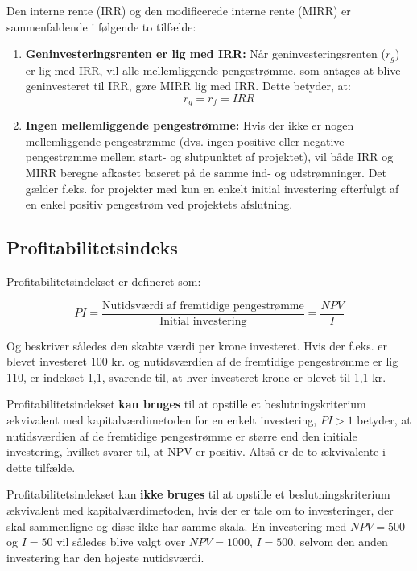 \documentclass[10pt,reqno, usenames]{article}
\begin{document}
\vspace{10 pt}

Den interne rente (IRR) og den modificerede interne rente (MIRR) er sammenfaldende i følgende to tilfælde:

\begin{enumerate}
  \item \textbf{Geninvesteringsrenten er lig med IRR:}
  Når geninvesteringsrenten (\(r_g\)) er lig med IRR, vil alle mellemliggende pengestrømme, som antages at blive geninvesteret til IRR, gøre MIRR lig med IRR. Dette betyder, at:
  \[
  r_g = r_f = IRR
  \]
  
  \item \textbf{Ingen mellemliggende pengestrømme:}
  Hvis der ikke er nogen mellemliggende pengestrømme (dvs. ingen positive eller negative pengestrømme mellem start- og slutpunktet af projektet), vil både IRR og MIRR beregne afkastet baseret på de samme ind- og udstrømninger. Det gælder f.eks. for projekter med kun en enkelt initial investering efterfulgt af en enkel positiv pengestrøm ved projektets afslutning. 
\end{enumerate}


\subsection{Profitabilitetsindeks}
Profitabilitetsindekset er defineret som: 

\begin{equation}
    PI = \frac{\text{Nutidsværdi af fremtidige pengestrømme}}{\text{Initial investering}} = \frac{NPV}{I}
\end{equation}

Og beskriver således den skabte værdi per krone investeret. Hvis der f.eks. er blevet investeret 100 kr. og nutidsværdien af de fremtidige pengestrømme er lig 110, er indekset 1,1, svarende til, at hver investeret krone er blevet til 1,1 kr. 

\vspace{10 pt}
Profitabilitetsindekset \textbf{kan bruges} til at opstille et beslutningskriterium ækvivalent med kapitalværdimetoden for en enkelt investering, $PI>1$ betyder, at nutidsværdien af de fremtidige pengestrømme er større end den initiale investering, hvilket svarer til, at NPV er positiv. Altså er de to ækvivalente i dette tilfælde. 

\vspace{10 pt}
Profitabilitetsindekset kan \textbf{ikke bruges} til at opstille et beslutningskriterium ækvivalent med kapitalværdimetoden, hvis der er tale om to investeringer, der skal sammenligne og disse ikke har samme skala. En investering med $NPV=500$ og $I=50$ vil således blive valgt over $NPV=1000$, $I=500$, selvom den anden investering har den højeste nutidsværdi.
\end{document}

